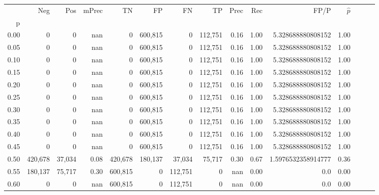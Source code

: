 \begin{tabular}{rrrrrrrrrrrrrrr}
\toprule
{} &      Neg &     Pos & mPrec &       TN &       FP &       FN &       TP &  Prec &   Rec &                FP/P & $\hat{p}$ \\
p    &          &         &       &          &          &          &          &       &       &                     &           \\
\midrule
0.00 &        0 &       0 &   nan &        0 &  600,815 &        0 &  112,751 &  0.16 &  1.00 &   5.328688880808152 &      1.00 \\
0.05 &        0 &       0 &   nan &        0 &  600,815 &        0 &  112,751 &  0.16 &  1.00 &   5.328688880808152 &      1.00 \\
0.10 &        0 &       0 &   nan &        0 &  600,815 &        0 &  112,751 &  0.16 &  1.00 &   5.328688880808152 &      1.00 \\
0.15 &        0 &       0 &   nan &        0 &  600,815 &        0 &  112,751 &  0.16 &  1.00 &   5.328688880808152 &      1.00 \\
0.20 &        0 &       0 &   nan &        0 &  600,815 &        0 &  112,751 &  0.16 &  1.00 &   5.328688880808152 &      1.00 \\
0.25 &        0 &       0 &   nan &        0 &  600,815 &        0 &  112,751 &  0.16 &  1.00 &   5.328688880808152 &      1.00 \\
0.30 &        0 &       0 &   nan &        0 &  600,815 &        0 &  112,751 &  0.16 &  1.00 &   5.328688880808152 &      1.00 \\
0.35 &        0 &       0 &   nan &        0 &  600,815 &        0 &  112,751 &  0.16 &  1.00 &   5.328688880808152 &      1.00 \\
0.40 &        0 &       0 &   nan &        0 &  600,815 &        0 &  112,751 &  0.16 &  1.00 &   5.328688880808152 &      1.00 \\
0.45 &        0 &       0 &   nan &        0 &  600,815 &        0 &  112,751 &  0.16 &  1.00 &   5.328688880808152 &      1.00 \\
0.50 &  420,678 &  37,034 &  0.08 &  420,678 &  180,137 &   37,034 &   75,717 &  0.30 &  0.67 &  1.5976532358914777 &      0.36 \\
0.55 &  180,137 &  75,717 &  0.30 &  600,815 &        0 &  112,751 &        0 &   nan &  0.00 &                 0.0 &      0.00 \\
0.60 &        0 &       0 &   nan &  600,815 &        0 &  112,751 &        0 &   nan &  0.00 &                 0.0 &      0.00 \\

\end{tabular}
